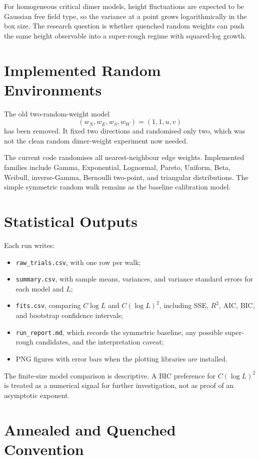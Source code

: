 \documentclass[11pt]{article}
\begin{document}
For homogeneous critical dimer models, height fluctuations are expected to be
Gaussian free field type, so the variance at a point grows logarithmically in
the box size.  The research question is whether quenched random weights can
push the same height observable into a super-rough regime with squared-log
growth.

\section{Implemented Random Environments}

The old two-random-weight model
\[
  (w_N,w_E,w_S,w_W)=(1,1,u,v)
\]
has been removed.  It fixed two directions and randomised only two, which was
not the clean random dimer-weight experiment now needed.

The current code randomises all nearest-neighbour edge weights.  Implemented
families include Gamma, Exponential, Lognormal, Pareto, Uniform, Beta, Weibull,
inverse-Gamma, Bernoulli two-point, and triangular distributions.  The simple
symmetric random walk remains as the baseline calibration model.

\section{Statistical Outputs}

Each run writes:
\begin{itemize}[leftmargin=1.5em]
  \item \texttt{raw\_trials.csv}, with one row per walk;
  \item \texttt{summary.csv}, with sample means, variances, and variance
        standard errors for each model and \(L\);
  \item \texttt{fits.csv}, comparing \(C\log L\) and \(C(\log L)^2\), including
        SSE, \(R^2\), AIC, BIC, and bootstrap confidence intervals;
  \item \texttt{run\_report.md}, which records the symmetric baseline, any
        possible super-rough candidates, and the interpretation caveat;
  \item PNG figures with error bars when the plotting libraries are installed.
\end{itemize}

The finite-size model comparison is descriptive.  A BIC preference for
\(C(\log L)^2\) is treated as a numerical signal for further investigation, not
as proof of an asymptotic exponent.

\section{Annealed and Quenched Convention}
\end{document}
